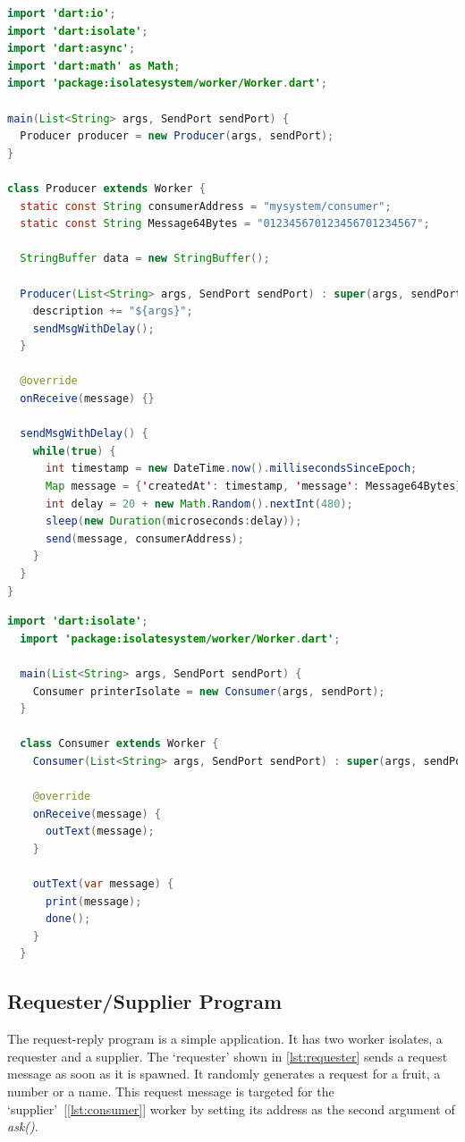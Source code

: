 \newpage
\begin{lstlisting}[language=java, firstnumber=1, caption=Basic version of Producer Worker of Producer-Consumer application, label=lst:producer]
import 'dart:io';
import 'dart:isolate';
import 'dart:async';
import 'dart:math' as Math;
import 'package:isolatesystem/worker/Worker.dart';

main(List<String> args, SendPort sendPort) {
  Producer producer = new Producer(args, sendPort);
}

class Producer extends Worker {
  static const String consumerAddress = "mysystem/consumer";
  static const String Message64Bytes = "012345670123456701234567";

  StringBuffer data = new StringBuffer();

  Producer(List<String> args, SendPort sendPort) : super(args, sendPort) {
    description += "${args}";
    sendMsgWithDelay();
  }

  @override
  onReceive(message) {}

  sendMsgWithDelay() {
    while(true) {
      int timestamp = new DateTime.now().millisecondsSinceEpoch;
      Map message = {'createdAt': timestamp, 'message': Message64Bytes};
      int delay = 20 + new Math.Random().nextInt(480);
      sleep(new Duration(microseconds:delay));
      send(message, consumerAddress);
    }
  }
}
\end{lstlisting}


\newpage
\begin{lstlisting}[language=java, firstnumber=1, caption=Basic version of Consumer Worker of Producer-Consumer application, label=lst:consumer]
  import 'dart:isolate';
  import 'package:isolatesystem/worker/Worker.dart';

  main(List<String> args, SendPort sendPort) {
    Consumer printerIsolate = new Consumer(args, sendPort);
  }

  class Consumer extends Worker {
    Consumer(List<String> args, SendPort sendPort) : super(args, sendPort);

    @override
    onReceive(message) {
      outText(message);
    }

    outText(var message) {
      print(message);
      done();
    }
  }

\end{lstlisting}

\subsection{Requester/Supplier Program}
\label{sec:request-reply-program}
The request-reply program is a simple application. It has two worker isolates, a requester and a supplier. The ‘requester’ shown in \autoref{lst:requester} sends a request message as soon as it is spawned. It randomly generates a request for a fruit, a number or a name. This request message is targeted for the ‘supplier’~[\autoref{lst:consumer}] worker by setting its address as the second argument of \emph{ask()}.

